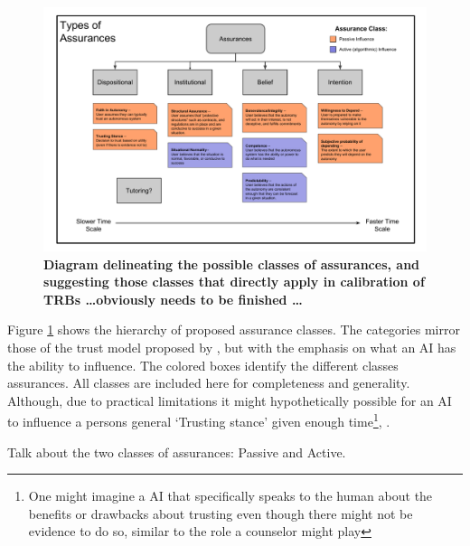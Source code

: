	\begin{figure}
        \includegraphics[width=8in]{Figures/Assurances.pdf}%
    	\caption{\textbf{Diagram delineating the possible classes of assurances, and suggesting those classes that directly apply in calibration of TRBs \ldots obviously needs to be finished \ldots}}
        \label{fig:Assurance_classes}
    \end{figure}

    Figure \ref{fig:Assurance_classes} shows the hierarchy of proposed assurance classes. The categories mirror those of the trust model proposed by \citet{McKnight2001-fa}, but with the emphasis on what an AI has the ability to influence. The colored boxes identify the different classes assurances. All classes are included here for completeness and generality. Although, due to practical limitations it might hypothetically possible for an AI to influence a persons general `Trusting stance' given enough time\footnote{One might imagine a AI that specifically speaks to the human about the benefits or drawbacks about trusting even though there might not be evidence to do so, similar to the role a counselor might play}, .

    Talk about the two classes of assurances: Passive and Active.

